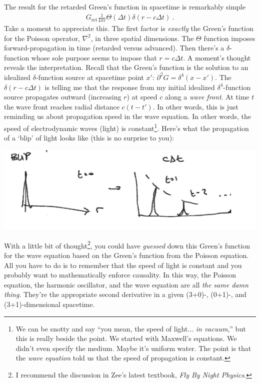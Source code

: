 The result for the retarded Green's function in spacetime is remarkably simple
\begin{align}
	G_\text{ret} \frac{1}{4\pi r} \Theta(\Delta t) \delta(r-c\Delta t) \ .
\end{align}
Take a moment to appreciate this. The first factor is \emph{exactly} the Green's function for the Poisson operator, $\nabla^2$, in three spatial dimensions. The $\Theta$ function imposes forward-propagation in time (retarded versus advanced). Then there's a $\delta$-function whose sole purpose seems to impose that $r = c\Delta t$. A moment's thought reveals the interpretation. Recall that the Green's function is the solution to an idealized $\delta$-function source at spacetime point $x'$: $\partial^2 G = \delta^4(x-x')$. The $\delta(r-c\Delta t)$ is telling me that the response from my initial idealized $\delta^4$-function source propagates outward (increasing $r$) at speed $c$ along a \emph{wave front}. At time $t$ the wave front reaches radial distance $c(t-t')$. In other words, this is just reminding us about propagation speed in the wave equation. In other words, the speed of electrodynamic waves (light) is constant\footnote{We can be snotty and say ``you mean, the speed of light... \emph{in vacuum},'' but this is really beside the point. We started with Maxwell's equations. We didn't even specify the medium. Maybe it's uniform water. The point is that the \emph{wave equation} told us that the speed of propagation is constant.}. Here's what the propagation of a `blip' of light looks like (this is no surprise to you):
\begin{center}
\includegraphics[width=.9\textwidth]{figures/Lec27_3dblip.png}
\end{center}

With a little bit of thought\footnote{I recommend the discussion in Zee's latest textbook, \emph{Fly By Night Physics}.}, you could have \emph{guessed} down this Green's function for the wave equation based on the Green's function from the Poisson equation. All you have to do is to remember that the speed of light is constant and you probably want to mathematically enforce causality. In this way, the Poisson equation, the harmonic oscillator, and the wave equation are all \emph{the same damn thing}. They're the appropriate second derivative in a given (3+0)-, (0+1)-, and (3+1)-dimensional spacetime.

